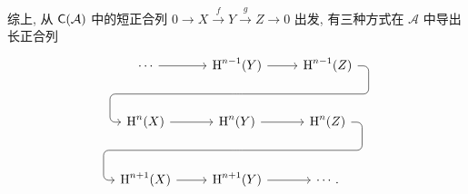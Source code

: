 综上, 从 $\mathsf{C}(\mathcal{A})$ 中的短正合列 $0 \to X \xrightarrow{f} Y \xrightarrow{g} Z \to 0$ 出发, 有三种方式在 $\mathcal{A}$ 中导出长正合列
\[\begin{tikzcd}[row sep=large]
	\cdots \arrow[r] & \Hm^{n-1}(Y) \arrow[r] \arrow[phantom, d, ""{coordinate, name=A}] & \Hm^{n-1}(Z) \arrow[dll, rounded corners, to path={
		-- ([xshift=2ex]\tikztostart.east)
		|- (A) [near end]\tikztonodes
		-| ([xshift=-2ex]\tikztotarget.west)
		-- (\tikztotarget)}] \\
	\Hm^n(X) \arrow[r] & \Hm^n(Y) \arrow[r] \arrow[phantom, d, ""{coordinate, name=B}] & \Hm^n(Z) \arrow[dll, rounded corners, to path={
		-- ([xshift=2ex]\tikztostart.east)
		|- (B) [near end]\tikztonodes
		-| ([xshift=-2ex]\tikztotarget.west)
		-- (\tikztotarget)}] \\
	\Hm^{n+1}(X) \arrow[r] & \Hm^{n+1}(Y) \arrow[r] & \cdots .
\end{tikzcd}\]
